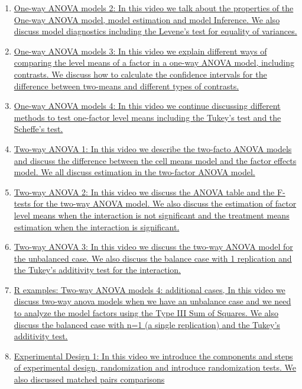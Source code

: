 \documentclass[11pt]{article}
\begin{document}
\begin{enumerate}
	\item \href{https://mp.weixin.qq.com/s/iIk1csBKWV8vKIz7GDJgzg}{One-way ANOVA models 2: In this video we talk about the properties of the One-way ANOVA model, model estimation and model Inference. We also discuss model diagnostics including the Levene's test for equality of variances.}	%
	\item \href{https://mp.weixin.qq.com/s/ljze-kWn1NG2B8qjnTHy6g}{One-way ANOVA models 3: In this video we explain different ways of comparing the level means of a factor in a one-way ANOVA model, including contrasts. We discuss how to calculate the confidence intervals for the difference between two-means and different types of contrasts.}	%
	\item \href{https://mp.weixin.qq.com/s/Ieh3JwQoZS-savFa6dgV-g}{One-way ANOVA models 4: In this video we continue discussing different methods to test one-factor level means including the Tukey's test and the Scheffe's test.}	%
	\item \href{https://mp.weixin.qq.com/s/yFyfTGox2ZUxLdXx80C7SQ}{Two-way ANOVA 1: In this video we describe the two-facto ANOVA models and discuss the difference between the cell means model and the factor effects model. We all discuss estimation in the two-factor ANOVA model.}	%
	\item \href{https://mp.weixin.qq.com/s/OkR8MV5gNZdqFEGQPXsg_A}{Two-way ANOVA 2: In this video we discuss the ANOVA table and the F-tests for the two-way ANOVA model. We also discuss the estimation of factor level means when the interaction is not significant and the treatment means estimation when the interaction is significant.}	%
	\item \href{https://mp.weixin.qq.com/s/A2PSRjlhJ7gQQD1JCZ4qeg}{Two-way ANOVA 3: In this video we discuss the two-way ANOVA model for the unbalanced case. We also discuss the balance case with 1 replication and the Tukey's additivity test for the interaction.}	%
	\item \href{https://mp.weixin.qq.com/s/8zY8Ez-iXy3RCoy-U9cICg}{R examples: Two-way ANOVA models 4: additional cases, In this video we discuss two-way anova models when we have an unbalance case and we need to analyze the model factors using the Type III Sum of Squares. We also discuss the balanced case with n=1 (a single replication) and the Tukey's additivity test.}	%
	\item \href{https://mp.weixin.qq.com/s/U8rizPEskkZOpHZhKMqKCA}{Experimental Design 1: In this video we introduce the components and steps of experimental design, randomization and introduce randomization tests. We also discussed matched pairs comparisons}	%

\end{enumerate}
\end{document}
